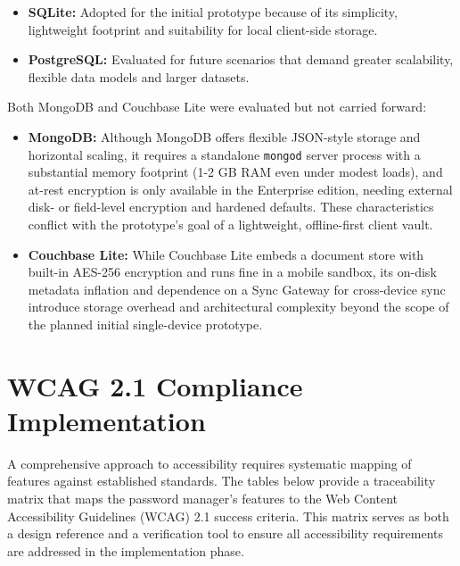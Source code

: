 \begin{itemize}
  \item \textbf{SQLite:} Adopted for the initial prototype because of its simplicity, lightweight footprint and suitability for local client-side storage.
  \item \textbf{PostgreSQL:} Evaluated for future scenarios that demand greater scalability, flexible data models and larger datasets.
\end{itemize}

Both MongoDB and Couchbase Lite were evaluated but not carried forward:

\begin{itemize}
  \item \textbf{MongoDB:} Although MongoDB offers flexible JSON-style storage and horizontal scaling, it requires a standalone \texttt{mongod} server process with a substantial memory footprint (1-2 GB RAM even under modest loads), and at-rest encryption is only available in the Enterprise edition, needing external disk- or field-level encryption and hardened defaults. These characteristics conflict with the prototype's goal of a lightweight, offline-first client vault.
  \item \textbf{Couchbase Lite:} While Couchbase Lite embeds a document store with built-in AES-256 encryption and runs fine in a mobile sandbox, its on-disk metadata inflation and dependence on a Sync Gateway for cross-device sync introduce storage overhead and architectural complexity beyond the scope of the planned initial single-device prototype.
\end{itemize}
\section{WCAG 2.1 Compliance Implementation}
\label{sec:wcag-compliance}

A comprehensive approach to accessibility requires systematic mapping of features against established standards. The tables below provide a traceability matrix that maps the password manager’s features to the Web Content Accessibility Guidelines (WCAG) 2.1 success criteria. This matrix serves as both a design reference and a verification tool to ensure all accessibility requirements are addressed in the implementation phase.

